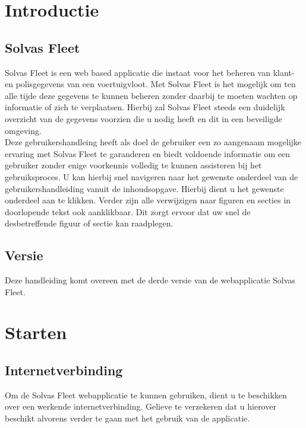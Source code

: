 \documentclass[11pt,openany]{article}
\begin{document}


\newpage
\tableofcontents
\newpage


\section{Introductie}
\subsection{Solvas Fleet}
Solvas Fleet is een web based applicatie die instaat voor het beheren van klant- en polisgegevens van een voertuigvloot.
 Met Solvas Fleet is het mogelijk om ten alle tijde deze gegevens te kunnen beheren zonder daarbij te moeten wachten op informatie of zich te verplaatsen.  
 Hierbij zal Solvas Fleet steeds een duidelijk overzicht van de gegevens voorzien die u nodig heeft en dit in een beveiligde omgeving.\\

Deze gebruikershandleing heeft als doel de gebruiker een zo aangenaam mogelijke ervaring met Solvas Fleet 
te garanderen en biedt voldoende informatie om een gebruiker zonder enige voorkennis volledig te kunnen assisteren bij het gebruiksproces. 
U kan hierbij snel navigeren naar het gewenste onderdeel van de gebruikershandleiding vanuit de inhoudsopgave. 
Hierbij dient u het gewenste onderdeel aan te klikken. 
Verder zijn alle verwijzigen naar figuren en secties in doorlopende tekst ook aanklikbaar. 
Dit zorgt ervoor dat uw snel de desbetreffende figuur of sectie kan raadplegen.

\subsection{Versie}
Deze handleiding komt overeen met de derde versie van de webapplicatie Solvas Fleet.

\section{Starten}

\subsection{Internetverbinding}
Om de Solvas Fleet webapplicatie te kunnen gebruiken, dient u te beschikken over een werkende internetverbinding. 
Gelieve te verzekeren dat u hierover beschikt alvorens verder te gaan met het gebruik van de applicatie.
\end{document}
